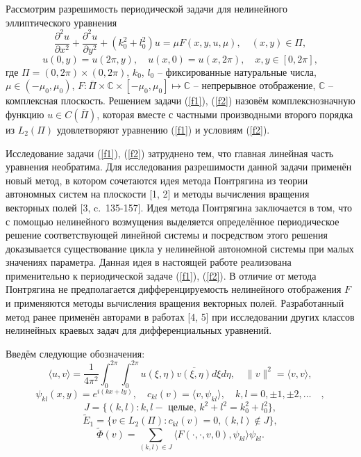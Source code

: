 
\vzmscaption

Рассмотрим разрешимость периодической задачи для нелинейного
эллиптического уравнения
\begin{equation}\label{f1}
\frac{\partial^2u}{\partial x^2}+\frac{\partial^2u}{\partial
y^2}+(k_0^2+l_0^2)u=\mu F(x,y,u,\mu), \quad (x, y)\in \Pi,
\end{equation}
\begin{equation}\label{f2}
u(0,y)=u(2\pi ,y), \quad u(x,0)=u(x,2\pi), \quad x, y\in [0,
2\pi],
\end{equation}
где $\Pi=(0,2\pi)\times (0,2\pi)$, $k_0$, $l_0$ -- фиксированные натуральные числа, $\mu\in
(-\mu_0, \mu_0)$, $F : \overline{\Pi}\times \mathbb{C}\times
[-\mu_0, \mu_0]\mapsto \mathbb{C}$ -- непрерывное отображение,
$\mathbb{C}$ -- комплексная плоскость. Решением задачи (\ref{f1}),
(\ref{f2}) назовём комплекснозначную функцию $u\in
C(\overline{\Pi})$, которая вместе с частными производными второго
порядка из $L_2(\Pi)$ удовлетворяют уравнению (\ref{f1}) и
условиям (\ref{f2}).

Исследование задачи (\ref{f1}), (\ref{f2}) затруднено тем, что
главная линейная часть уравнения необратима. Для исследования
разрешимости данной задачи применён новый метод, в котором
сочетаются идея метода Понтрягина из теории автономных систем на
плоскости [1, 2] и методы вычисления вращения векторных полей [3, c.~135-157].
Идея метода Понтрягина заключается
в том, что с помощью нелинейного возмущения выделяется
определённое периодическое решение соответствующей линейной
системы и посредством этого решения доказывается существование
цикла у нелинейной автономной системы при малых значениях
параметра. Данная идея в настоящей работе реализована
применительно к периодической задаче (\ref{f1}), (\ref{f2}). В
отличие от метода Понтрягина не предполагается дифференцируемость
нелинейного отображения $F$ и применяются методы вычисления
вращения векторных полей.
Разработанный метод ранее применён авторами в работах [4, 5]
при исследовании других классов нелинейных краевых
задач для дифференциальных уравнений.

Введём следующие обозначения:
$$
\langle u , v \rangle =
\frac{1}{4\pi^2}\int_0^{2\pi}\int_0^{2\pi}u(\xi,\eta)\overline{v(\xi,\eta)}d\xi
d\eta, \quad \|v\|^2=\langle v , v \rangle,
$$
$$
\psi_{kl}(x,y)=e^{i(kx+ly)}, \quad c_{kl}(v)=\langle v , \psi_{kl}\rangle,
\quad k, l = 0, \pm 1, \pm 2, \ldots \quad ,
$$
$$
J=\{(k,l): k, l - \mbox{ целые, } k^2+l^2=k_0^2+l_0^2 \},
$$
$$
\widetilde{E}_1=\{ v\in L_2(\Pi):  c_{kl}(v)=0, (k,l)\not\in J \},
$$
$$
\widetilde{\Phi}(v)=\sum_{(k,l)\in
J}\langle F(\cdot,\cdot,v,0),\psi_{kl}\rangle\psi_{kl}.
$$


